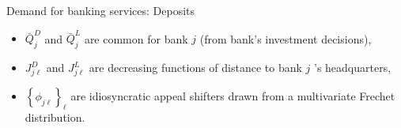 \documentclass[notes,10pt, aspectratio=169]{beamer}
\newenvironment{wideitemize}{\itemize\addtolength{\itemsep}{10pt}}{\enditemize}
\begin{document}
\begin{frame}{Demand for banking services: Deposits}
\begin{wideitemize}
        \begin{itemize}
            \item $\bar{Q}_j^D$ and $\bar{Q}_j^L$ are common for bank $j$ (from bank's investment decisions), 
            \item $J_{j \ell}^D$ and $J_{j \ell}^L$ are decreasing functions of distance to bank $j$ 's headquarters, 
            \item $\left\{\phi_{j \ell}\right\}_{\ell}$ are idiosyncratic appeal shifters drawn from a multivariate Frechet distribution.
        \end{itemize}


    \end{wideitemize}

\end{frame}
\end{document}
